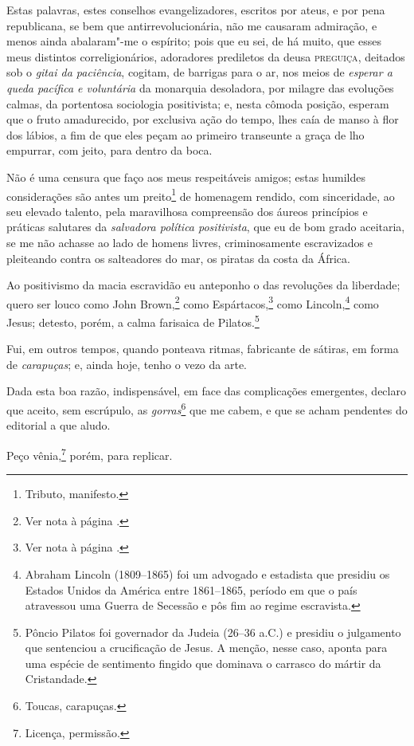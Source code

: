 Estas palavras, estes conselhos evangelizadores, escritos por ateus, e
por pena republicana, se bem que antirrevolucionária, não me causaram
admiração, e menos ainda abalaram"-me o espírito; pois que eu sei, de há
muito, que esses meus distintos correligionários, adoradores prediletos
da deusa \textsc{preguiça}, deitados sob o \emph{gitai da paciência}, cogitam, de
barrigas para o ar, nos meios de \emph{esperar a queda pacífica e
voluntária} da monarquia desoladora, por milagre das evoluções calmas,
da portentosa sociologia positivista; e, nesta cômoda posição, esperam
que o fruto amadurecido, por exclusiva ação do tempo, lhes caía de manso
à flor dos lábios, a fim de que eles peçam ao primeiro transeunte a
graça de lho empurrar, com jeito, para dentro da boca.

Não é uma censura que faço aos meus respeitáveis amigos; estas humildes
considerações são antes um preito\footnote{Tributo, manifesto.} de
homenagem rendido, com sinceridade, ao seu elevado talento, pela
maravilhosa compreensão dos áureos princípios e práticas salutares da
\emph{salvadora política positivista}, que eu de bom grado aceitaria, se
me não achasse ao lado de homens livres, criminosamente escravizados e
pleiteando contra os salteadores do mar, os piratas da costa da África.

Ao positivismo da macia escravidão eu anteponho o das revoluções da
liberdade; quero ser louco como John
Brown,\footnote{Ver nota à página \pageref{brown}.} como
Espártacos,\footnote{Ver nota à página \pageref{espartacos}.} como Lincoln,\footnote{Abraham Lincoln (1809--1865) foi
  um advogado e estadista que presidiu os Estados Unidos da América
  entre 1861--1865, período em que o país atravessou uma Guerra de
  Secessão e pôs fim ao regime escravista.} como Jesus; detesto, porém,
a calma farisaica de Pilatos.\footnote{Pôncio Pilatos foi governador
  da Judeia (26--36 a.C.) e presidiu o julgamento que sentenciou a
  crucificação de Jesus. A menção, nesse caso, aponta para uma espécie
  de sentimento fingido que dominava o carrasco do mártir da
  Cristandade.}

Fui, em outros tempos, quando ponteava ritmas, fabricante de sátiras, em
forma de \emph{carapuças}; e, ainda hoje, tenho o vezo da arte.

Dada esta boa razão, indispensável, em face das complicações emergentes,
declaro que aceito, sem escrúpulo, as \emph{gorras}\footnote{Toucas,
  carapuças.} que me cabem, e que se acham pendentes do editorial a que
aludo.

Peço vênia,\footnote{Licença, permissão.} porém, para replicar.

